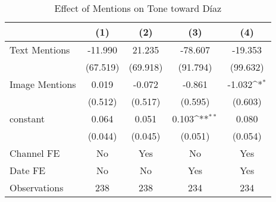 \begin{table}[htbp]\centering
\def\sym#1{\ifmmode^{#1}\else\(^{#1}\)\fi}
\caption{Effect of Mentions on Tone toward Díaz}
\begin{tabular}{l*{4}{c}}
\hline\hline
                &\multicolumn{1}{c}{(1)}         &\multicolumn{1}{c}{(2)}         &\multicolumn{1}{c}{(3)}         &\multicolumn{1}{c}{(4)}         \\
\hline
Text Mentions   &  -11.990         &   21.235         &  -78.607         &  -19.353         \\
                & (67.519)         & (69.918)         & (91.794)         & (99.632)         \\
Image Mentions  &    0.019         &   -0.072         &   -0.861         &   -1.032\sym{*}  \\
                &  (0.512)         &  (0.517)         &  (0.595)         &  (0.603)         \\
constant          &    0.064         &    0.051         &    0.103\sym{**} &    0.080         \\
                &  (0.044)         &  (0.045)         &  (0.051)         &  (0.054)         \\
Channel FE      &       No         &      Yes         &       No         &      Yes         \\
Date FE         &       No         &       No         &      Yes         &      Yes         \\
\hline
Observations    &      238         &      238         &      234         &      234         \\
\hline\hline
\end{tabular}
\end{table}
